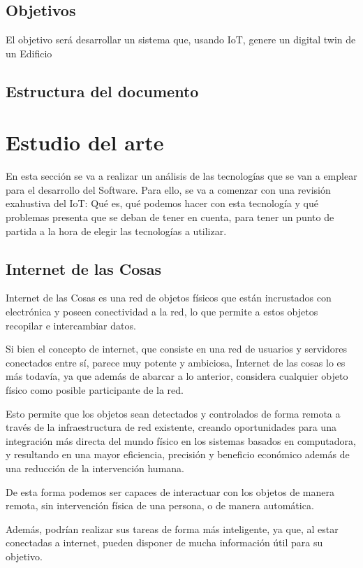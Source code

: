 \documentclass[12pt, a4paper, twoside]{article}
\begin{document}
\subsection{Objetivos}
El objetivo será desarrollar un sistema que, usando IoT, genere un digital twin de un Edificio
\subsection{Estructura del documento}

\section{Estudio del arte}
En esta sección se va a realizar un análisis de las tecnologías que se van a emplear para el 
desarrollo del Software. Para ello, se va a comenzar con una revisión exahustiva del IoT: 
Qué es, qué podemos hacer con esta tecnología y qué problemas presenta que se deban de tener en cuenta,
 para tener un punto de partida a la hora de elegir las tecnologías a utilizar.
 \subsection{Internet de las Cosas}
 Internet de las Cosas es una red de objetos físicos que están incrustados con electrónica y poseen 
 conectividad a la red, lo que permite a estos objetos recopilar e intercambiar datos.

 Si bien el concepto de internet, que consiste en una red de usuarios y servidores conectados entre sí,
 parece muy potente y ambiciosa, Internet de las cosas lo es más todavía, ya que además de abarcar a 
 lo anterior, considera cualquier objeto físico como posible participante de la red.

 Esto permite que los objetos sean detectados y controlados de forma remota a través de la  infraestructura de red existente, 
 creando oportunidades para una integración más directa del mundo físico en los sistemas basados 
 en computadora, y resultando en una mayor eficiencia, precisión y beneficio económico además 
 de una reducción de la intervención humana. 
 
 De esta forma podemos ser capaces de interactuar con los objetos de manera remota, sin intervención física de
 una persona, o de manera automática.
 
 Además, podrían realizar sus tareas de forma más inteligente, ya que, al estar conectadas a internet, pueden
 disponer de mucha información útil para su objetivo.
\end{document}
